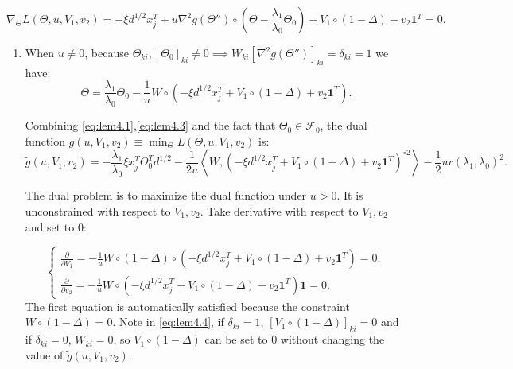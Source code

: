 \begin{equation}
    \label{eq:lem4.2}
    \nabla_\Theta L(\Theta,u,V_1,v_2)=-\xi d^{1/2}x_j^T+u\nabla^2g(\Theta'')\circ(\Theta-\frac{\lambda_1}{\lambda_0}\Theta_{0})+V_1\circ(1-\Delta)+v_2\mathbf{1}^T=0.
\end{equation}

\begin{enumerate}
    \item When $u\neq 0$, because $\Theta_{ki},[\Theta_0]_{ki}\neq0\implies W_{ki}[\nabla^2g(\Theta'')]_{ki}=\delta_{ki}=1$ we have:
    \begin{equation}
        \label{eq:lem4.3}
        \Theta=\frac{\lambda_1}{\lambda_0}\Theta_{0}-\frac{1}{u}W\circ\left(-\xi d^{1/2}x_j^T+V_1\circ(1-\Delta)+v_2\mathbf{1}^T\right).
    \end{equation}

    Combining \eqref{eq:lem4.1},\eqref{eq:lem4.3} and the fact that $\Theta_{0}\in\mathcal{F}_{0}$, the dual function $\bar{g}(u,V_1,v_2)\equiv\min_\Theta L(\Theta,u,V_1,v_2)$ is:
    \begin{equation}
    \label{eq:lem4.4}
    \tilde{g}(u,V_1,v_2)=-\frac{\lambda_1}{\lambda_0}\xi x_j^T\Theta_{0}^Td^{1/2}-\frac{1}{2u}\left\langle W,\left( -\xi d^{1/2} x_j^T+V_1\circ(1-\Delta)+v_2\mathbf{1}^T\right)^{\circ2}\right\rangle-\frac{1}{2}ur(\lambda_1,\lambda_0)^2.
    \end{equation}

    The dual problem is to maximize the dual function under $u> 0$. It is unconstrained with respect to $V_1,v_2$. Take derivative with respect to $V_1,v_2$ and set to 0:

    \begin{equation}
        \label{eq:lem4.5}
        \begin{cases}
        \frac{\partial}{\partial V_1}=-\frac{1}{u}W\circ(1-\Delta)\circ\left(-\xi d^{1/2} x_j^T+V_1\circ(1-\Delta)+v_2\mathbf{1}^T\right)=0,\\
        \frac{\partial}{\partial v_2}=-\frac{1}{u}W\circ\left( -\xi d^{1/2} x_j^T+V_1\circ(1-\Delta)+v_2\mathbf{1}^T\right)\mathbf{1}=0.
        \end{cases}
    \end{equation}
    The first equation is automatically satisfied because the constraint $W\circ(1-\Delta)=0$. Note in \eqref{eq:lem4.4}, if $\delta_{ki}=1$, $[V_1\circ(1-\Delta)]_{ki}=0$ and if $\delta_{ki}=0$, $W_{ki}=0$, so $V_1\circ(1-\Delta)$ can be set to 0 without changing the value of $\tilde{g}(u,V_1,v_2)$.


\end{enumerate}
